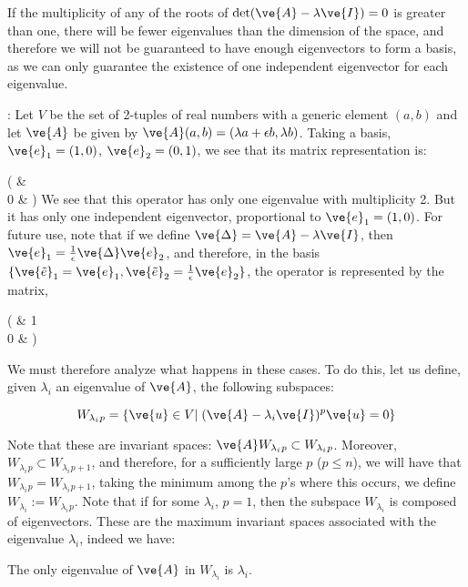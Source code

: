 If the multiplicity of any of the roots of $\det(\ve{A}-\lambda\ve{I})=0$ is 
greater than one, there will be fewer eigenvalues than the dimension of the space, and therefore we will not be guaranteed to have enough eigenvectors to form a basis, as we can only guarantee the existence of one independent eigenvector for each eigenvalue.

\ejem: Let $V$ be the set of 2-tuples of real numbers with a generic element
$(a,b)$ and let $\ve{A}$ be given by $\ve{A}(a,b) = (\lambda a+\epsilon b,\lambda b)$. Taking a basis, 
$\ve{e}_1=(1,0)$, 
$\ve{e}_2=(0,1)$, we see that its matrix representation is:

\beq\left(
     \lambda & \epsilon    \\
     0 &  \lambda
     \earr\right)
\eeq
%
We see that this operator has only one eigenvalue with multiplicity 2. But it has only one independent eigenvector, proportional to $\ve{e}_1=(1,0)$. For future use, note that if we define 
$\ve{\Delta} = \ve{A}-\lambda \ve{I}$, then $\ve{e}_{1} = \frac{1}{\epsilon}\ve{\Delta}\ve{e}_2$,
and therefore, in the basis $\{\ve{\tilde{e}}_{1} = \ve{e}_{1}, \ve{\tilde{e}}_{2} = \frac{1}{\epsilon}\ve{e}_{2}\}$,
the operator is represented by the matrix,

\beq\left(
     \lambda & 1    \\
     0 &  \lambda
     \earr\right)
\eeq

\espa

We must therefore analyze what happens in these cases. 
To do this, let us define, 
given $\lambda_i$ an eigenvalue of $\ve{A}$, the 
following subspaces:

\begin{equation}
  \label{eq:W_lm}
  W_{\lambda_i}{}_p = \{ \ve{u} \in V | \; (\ve{A} - \lambda_i \ve{I})^p \ve{u} = 0 \}
\end{equation}

Note that these are invariant spaces: 
$\ve{A} W_{\lambda_i}{}_p \subset W_{\lambda_i}{}_p$.
Moreover, $W_{\lambda_i}{}_p \subset W_{\lambda_i}{}_{p+1}$, and therefore, for a sufficiently large $p$ ($p \leq n$), we will have that 
$W_{\lambda_i}{}_p = W_{\lambda_i}{}_{p+1}$, taking the minimum among the
$p$'s where this occurs, we define $W_{\lambda_i} := W_{\lambda_i}{}_p$.
Note that if for some $\lambda_i$, $p=1$, then the subspace $W_{\lambda_i}$
is composed of eigenvectors.
These are the maximum invariant spaces associated with the eigenvalue $\lambda_i$,
indeed we have:

\blem
The only eigenvalue of $\ve{A}$ in $W_{\lambda_i}$ is $\lambda_i$.
\elem

